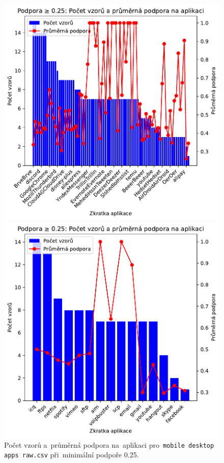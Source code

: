 \begin{figure}[H]
    \centering
    \begin{minipage}[t]{0.49\textwidth}
        \centering
    \includegraphics[width=\linewidth]{obrazky-figures/exps/patterns_support_0.25_mobile.pdf}
    \caption{Počet vzorů a~průměrná podpora na~aplikaci pro~\texttt{mobile desktop apps raw.csv} při~minimální podpoře 0.25.}
    \label{fig:appendix-}
    \end{minipage}%
    \hfill
    \begin{minipage}[t]{0.49\textwidth}
       \centering
        \includegraphics[width=\linewidth]{obrazky-figures/exps/patterns_support_0.25_iscx.pdf}

\end{minipage}
\end{figure}
